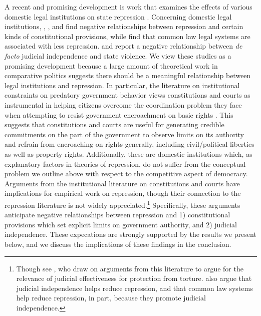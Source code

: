\documentclass[12pt]{article}
\begin{document}
A recent and promising development is work that examines the effects of various domestic legal institutions on state repression \citep{Davenport1996JOP,Cross1999,KeithTatePoe2009,PowellStaton2009,Mitchell2013}. Concerning domestic legal institutions, \citet{Davenport1996JOP}, \citet{Cross1999}, and \citet{KeithTatePoe2009} find negative relationships between repression and certain kinds of constitutional provisions, while \citet{Mitchell2013} find that common law legal systems are associated with less repression. \citet{PowellStaton2009} and \citet{Mitchell2013} report a negative relationship between {\it de facto} judicial independence and state violence. We view these studies as a promising development because a large amount of theoretical work in comparative politics suggests there should be a meaningful relationship between legal institutions and repression. In particular, the literature on institutional constraints on predatory government behavior views constitutions and courts as instrumental in helping citizens overcome the coordination problem they face when attempting to resist government encroachment on basic rights \citep{NorthWeingast1989, Ordeshook1992, Weingast1997, Carey2000, Vanberg2005, ElkinsGinsburgMelton2009}. This suggests that constitutions and courts are useful for generating credible commitments on the part of the government to observe limits on its authority and refrain from encroaching on rights generally, including civil/political liberties as well as property rights. Additionally, these are domestic institutions which, as explanatory factors in theories of repression, do not suffer from the conceptual problem we outline above with respect to the competitive aspect of democracy. Arguments from the institutional literature on constitutions and courts have implications for empirical work on repression, though their connection to the repression literature is not widely appreciated.\footnote{Though see \citet{PowellStaton2009}, who draw on arguments from this literature to argue for the relevance of judicial effectiveness for protection from torture. \citet{Mitchell2013} also argue that judicial independence helps reduce repression, and that common law systems help reduce repression, in part, because they promote judicial independence.} Specifically, these arguments anticipate negative relationships between repression and 1) constitutional provisions which set explicit limits on government authority, and 2) judicial independence. These expecations are strongly supported by the results we present below, and we discuss the implications of these findings in the conclusion. 
\end{document}
